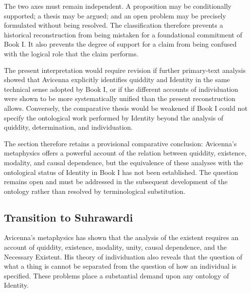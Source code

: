 The two
axes must
remain independent.
A proposition
may be
conditionally supported;
a thesis
may be
argued; and
an open
problem may
be precisely
formulated without
being resolved.
The classification
therefore prevents
a historical
reconstruction from
being mistaken
for a
foundational commitment
of Book I.
It also
prevents the
degree of
support for
a claim
from being
confused with
the logical
role that
the claim
performs.

\label{para:VS.B01.P01.C08.S13.SS18.P005}

The present
interpretation would
require revision
if further
primary-text analysis
showed that
Avicenna explicitly
identifies quiddity
and Identity
in the
same technical
sense adopted
by Book I,
or if
the different
accounts of
individuation were
shown to
be more
systematically unified
than the
present reconstruction
allows. Conversely,
the comparative
thesis would
be weakened
if Book I
could not
specify the
ontological work
performed by
Identity beyond
the analysis
of quiddity,
determination,
and individuation.

\label{para:VS.B01.P01.C08.S13.SS18.P006}

The section
therefore retains
a provisional
comparative conclusion:
Avicenna's metaphysics
offers a
powerful account
of the
relation between
quiddity,
existence,
modality,
and causal
dependence, but
the equivalence
of these
analyses with
the ontological
status of
Identity in
Book I
has not
been established.
The question
remains open
and must
be addressed
in the
subsequent development
of the
ontology rather
than resolved
by terminological
substitution.



\subsection{Transition to Suhrawardi}
\label{subsec:ch08-avicenna-transition}

\label{para:VS.B01.P01.C08.S13.SS19.P001}

Avicenna's metaphysics
has shown
that the
analysis of
the existent
requires an
account of
quiddity,
existence,
modality,
unity,
causal dependence,
and the
Necessary Existent.
His theory
of individuation
also reveals
that the
question of
what a
thing is
cannot be
separated from
the question
of how
an individual
is specified.
These problems
place a
substantial demand
upon any
ontology of
Identity.

